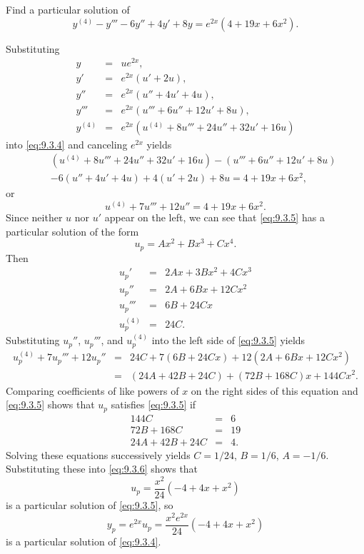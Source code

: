 \documentclass{ximera}
\begin{document}
\begin{example}\label{example:9.3.2}
Find a particular solution of
\begin{equation} \label{eq:9.3.4}
y^{(4)}-y'''-6y''+4y'+8y=e^{2x}(4+19x+6x^2).
\end{equation}

\begin{explanation}
Substituting
\begin{eqnarray*}
y&=&ue^{2x},\\ y'&=&e^{2x}(u'+2u),\\
y''&=&e^{2x}(u''+4u'+4u),\\
y'''&=&e^{2x}(u'''+6u''+12u'+8u),\\
y^{(4)}&=&e^{2x}(u^{(4)}+8u'''+24u''+32u'+16u)
\end{eqnarray*}
into \eqref{eq:9.3.4} and canceling $e^{2x}$ yields
\begin{eqnarray*}
&&(u^{(4)}+8u'''+24u''+32u'+16u)-(u'''+6u''+12u'+8u)\\
&&-6(u''+4u'+4u)+4(u'+2u)+8u=4+19x+6x^2,
\end{eqnarray*}
or
\begin{equation} \label{eq:9.3.5}
u^{(4)}+7u'''+12u''=4+19x+6x^2.
\end{equation}
Since neither $u$ nor $u'$ appear on the left, we can see that
\eqref{eq:9.3.5} has a particular solution of the form
\begin{equation} \label{eq:9.3.6}
u_p=Ax^2+Bx^3+Cx^4.
\end{equation}
Then
\begin{eqnarray*}
u_p'&=&2Ax+3Bx^2+4Cx^3\\
u_p''&=&2A+6Bx+12Cx^2\\
u_p'''&=&6B+24Cx\\
u_p^{(4)}&=&24C.
\end{eqnarray*}
Substituting $u_p''$, $u_p'''$, and $u_p^{(4)}$  into the left side of
\eqref{eq:9.3.5} yields
\begin{eqnarray*}
u_p^{(4)}+7u_p'''+12u_p''&=&24C+7(6B+24Cx)+12(2A+6Bx+12Cx^2)\\
&=&(24A+42B+24C)+(72B+168C)x+144Cx^2.
\end{eqnarray*}
Comparing coefficients of like powers of $x$ on the right sides of
this equation and \eqref{eq:9.3.5} shows that $u_p$ satisfies \eqref{eq:9.3.5}
if
$$
\begin{array}{rcr}
144C&=&6\\
72B+168C&=&19\\
24A+42B+24C&=&4.
\end{array}
$$
Solving these equations successively yields $C=1/24$, $B=1/6$, $A=-1/6$.
Substituting these into \eqref{eq:9.3.6} shows that
$$
u_p=\frac{x^2}{24}(-4+4x+x^2)
$$
is a particular solution of  \eqref{eq:9.3.5}, so
$$
y_p=e^{2x}u_p=\frac{x^2e^{2x}}{24}(-4+4x+x^2)
$$
is a particular solution of  \eqref{eq:9.3.4}.



\end{explanation}
\end{example}
\end{document}
